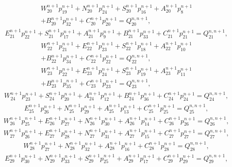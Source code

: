%
\begin{multline}
	W^{n+1}_{20}p^{n+1}_{19}+N^{n+1}_{20}p^{n+1}_{24}+S^{n+1}_{20}p^{n+1}_{16}+A^{n+1}_{20}p^{n+1}_{8}\\+B^{n+1}_{20}p^{n+1}_{32}+C^{n+1}_{20}p^{n+1}_{20}=Q^{n, n+1}_{20},
\end{multline}
%
\begin{multline}
	E^{n+1}_{21}p^{n+1}_{22}+S^{n+1}_{21}p^{n+1}_{17}+A^{n+1}_{21}p^{n+1}_{9}+B^{n+1}_{21}p^{n+1}_{33}+C^{n+1}_{21}p^{n+1}_{21}=Q^{n, n+1}_{21},
\end{multline}
%
\begin{multline}
	W^{n+1}_{22}p^{n+1}_{21}+E^{n+1}_{22}p^{n+1}_{23}+S^{n+1}_{22}p^{n+1}_{18}+A^{n+1}_{22}p^{n+1}_{10}\\+B^{n+1}_{22}p^{n+1}_{34}+C^{n+1}_{22}p^{n+1}_{22}=Q^{n, n+1}_{22},
\end{multline}
%
\begin{multline}
	W^{n+1}_{23}p^{n+1}_{22}+E^{n+1}_{23}p^{n+1}_{24}+S^{n+1}_{23}p^{n+1}_{19}+A^{n+1}_{23}p^{n+1}_{11}\\+B^{n+1}_{23}p^{n+1}_{35}+C^{n+1}_{23}p^{n+1}_{23}=Q^{n, n+1}_{23},
\end{multline}
%
\begin{multline}
	W^{n+1}_{24}p^{n+1}_{23}+S^{n+1}_{24}p^{n+1}_{20}+A^{n+1}_{24}p^{n+1}_{12}+B^{n+1}_{24}p^{n+1}_{36}+C^{n+1}_{24}p^{n+1}_{24}=Q^{n, n+1}_{24},
\end{multline}
%
\begin{multline}
	E^{n+1}_{25}p^{n+1}_{26}+N^{n+1}_{25}p^{n+1}_{29}+A^{n+1}_{25}p^{n+1}_{13}+C^{n+1}_{25}p^{n+1}_{25}=Q^{n, n+1}_{25},
\end{multline}
%
\begin{multline}
	W^{n+1}_{26}p^{n+1}_{25}+E^{n+1}_{26}p^{n+1}_{27}+N^{n+1}_{26}p^{n+1}_{30}+A^{n+1}_{26}p^{n+1}_{14}+C^{n+1}_{26}p^{n+1}_{26}=Q^{n, n+1}_{26},
\end{multline}
%
\begin{multline}
	W^{n+1}_{27}p^{n+1}_{26}+E^{n+1}_{27}p^{n+1}_{28}+N^{n+1}_{27}p^{n+1}_{31}+A^{n+1}_{27}p^{n+1}_{15}+C^{n+1}_{27}p^{n+1}_{27}=Q^{n, n+1}_{27},
\end{multline}
%
\begin{multline}
	W^{n+1}_{28}p^{n+1}_{27}+N^{n+1}_{28}p^{n+1}_{32}+A^{n+1}_{28}p^{n+1}_{16}+C^{n+1}_{28}p^{n+1}_{28}=Q^{n, n+1}_{28},
\end{multline}
%
\begin{multline}
	E^{n+1}_{29}p^{n+1}_{30}+N^{n+1}_{29}p^{n+1}_{33}+S^{n+1}_{29}p^{n+1}_{25}+A^{n+1}_{29}p^{n+1}_{17}+C^{n+1}_{29}p^{n+1}_{29}=Q^{n, n+1}_{29},
\end{multline}
